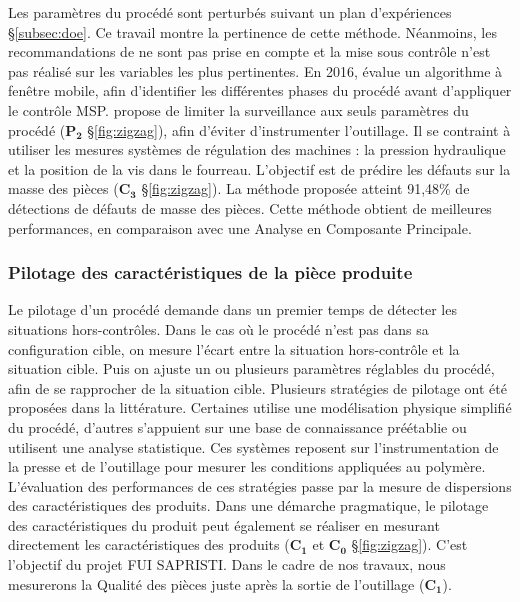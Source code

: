 Les paramètres du procédé sont perturbés suivant un plan d'expériences §\ref{subsec:doe}.
Ce travail montre la pertinence de cette méthode.
Néanmoins, les recommandations de \cite{pillet_maitrise_2003} ne sont pas prise en compte et la mise sous contrôle n'est pas réalisé sur les variables les plus pertinentes.
En 2016, \cite{liu_window-based_2016} évalue un algorithme à fenêtre mobile, afin d’identifier les différentes phases du procédé avant d’appliquer le contrôle MSP.
\cite{zhang_statistical_2016} propose de limiter la surveillance aux seuls paramètres du procédé ($\boldsymbol{P_2}$ §\ref{fig:zigzag}), afin d'éviter d'instrumenter l'outillage.
Il se contraint à utiliser les mesures systèmes de régulation des machines : la pression hydraulique et la position de la vis dans le fourreau.
L’objectif est de prédire les défauts sur la masse des pièces ($\boldsymbol{C_3}$ §\ref{fig:zigzag}).
La méthode proposée atteint 91,48\% de détections de défauts de masse des pièces.
Cette méthode obtient de meilleures performances, en comparaison avec une Analyse en Composante Principale.

\subsubsection{Pilotage des caractéristiques de la pièce produite}
Le pilotage d’un procédé demande dans un premier temps de détecter les situations hors-contrôles.
Dans le cas où le procédé n'est pas dans sa configuration cible, on mesure l’écart entre la situation hors-contrôle et la situation cible.
Puis on ajuste un ou plusieurs paramètres réglables du procédé, afin de se rapprocher de la situation cible.
Plusieurs stratégies de pilotage ont été proposées dans la littérature.
Certaines utilise une modélisation physique simplifié du procédé, d'autres s'appuient sur une base de connaissance préétablie ou utilisent une analyse statistique.
Ces systèmes reposent sur l’instrumentation de la presse et de l'outillage pour mesurer les conditions appliquées au polymère.
L'évaluation des performances de ces stratégies passe par la mesure de dispersions des caractéristiques des produits.
Dans une démarche pragmatique, le pilotage des caractéristiques du produit peut également se réaliser en mesurant directement les caractéristiques des produits ($\boldsymbol{C_1}$ et $\boldsymbol{C_0}$ §\ref{fig:zigzag}).
C'est l'objectif du projet FUI SAPRISTI.
Dans le cadre de nos travaux, nous mesurerons la Qualité des pièces juste après la sortie de l'outillage ($\boldsymbol{C_1}$).

